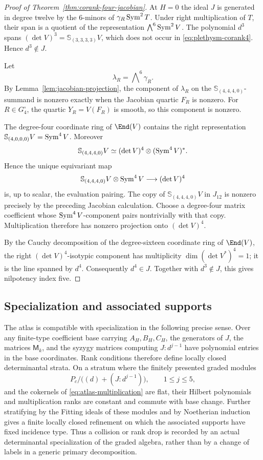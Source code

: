 \begin{proof}[Proof of Theorem~\ref{thm:corank-four-jacobian}]
At \(H=0\) the ideal \(J\) is generated in degree twelve by the
\(6\)-minors of \(\gamma_R\operatorname{Sym}^2T\).  Under right multiplication of
\(T\), their span is a quotient of the representation
\(\bigwedge^6\operatorname{Sym}^2V\).  The polynomial \(d^3\) spans
\((\det V)^3=\mathbb S_{(3,3,3,3)}V\), which does not occur in
\eqref{eq:plethysm-corank4}.  Hence \(d^3\notin J\).

Let
\[
 \lambda_R=\bigwedge\nolimits^6\gamma_R.
\]
By Lemma~\ref{lem:jacobian-projection}, the component of
\(\lambda_R\) on the
\(\mathbb S_{(4,4,4,0)}\)-summand is nonzero exactly when the
Jacobian quartic \(F_R\) is nonzero.  For \(R\in G_4^\circ\), the
quartic \(Y_R=V(F_R)\) is smooth, so this component is nonzero.

The degree-four coordinate ring of \(\End(V)\) contains the right
representation \(\mathbb S_{(4,0,0,0)}V=\operatorname{Sym}^4V\).  Moreover
\[
 \mathbb S_{(4,4,4,0)}V
 \simeq
 (\det V)^4\otimes(\operatorname{Sym}^4V)^*.
\]
Hence the unique equivariant map
\[
 \mathbb S_{(4,4,4,0)}V\otimes\operatorname{Sym}^4V
 \longrightarrow (\det V)^4
\]
is, up to scalar, the evaluation pairing.  The copy of
\(\mathbb S_{(4,4,4,0)}V\) in \(J_{12}\) is nonzero precisely by
the preceding Jacobian calculation.  Choose a degree-four matrix
coefficient whose \(\operatorname{Sym}^4V\)-component pairs nontrivially with
that copy.  Multiplication therefore has nonzero projection onto
\((\det V)^4\).

By the Cauchy decomposition of the degree-sixteen coordinate ring of
\(\End(V)\), the right \((\det V)^4\)-isotypic component has
multiplicity
\(\dim (\det V^*)^4=1\); it is the line spanned by \(d^4\).
Consequently \(d^4\in J\).  Together with \(d^3\notin J\), this
gives nilpotency index five.
\end{proof}

\subsection{Specialization and associated supports}

The atlas is compatible with specialization in the following precise
sense.  Over any finite-type coefficient base carrying \(A_H,B_H,C_H\),
the generators of \(J\), the matrices \(\mathsf M_k\), and the syzygy
matrices computing \(J:d^{j-1}\) have polynomial entries in the base
coordinates.  Rank conditions therefore define locally closed
determinantal strata.  On a stratum where the finitely presented
graded modules
\[
 P_c/\bigl((d)+(J:d^{j-1})\bigr),\qquad1\le j\le5,
\]
and the cokernels of
\eqref{eq:atlas-multiplication} are flat, their Hilbert polynomials and
multiplication ranks are constant and commute with base change.
Further stratifying by the Fitting ideals of these modules and by
Noetherian induction gives a finite locally closed refinement on which
the associated supports have fixed incidence type.  Thus a collision
or rank drop is recorded by an actual determinantal specialization of
the graded algebra, rather than by a change of labels in a generic
primary decomposition.
